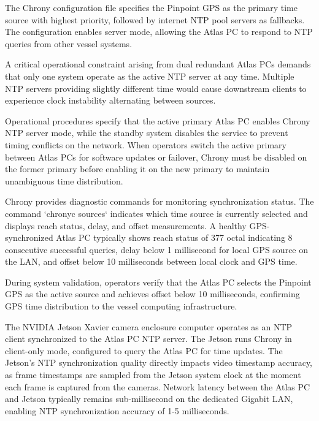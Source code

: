 \documentclass{erauthesis}
\begin{document}
The Chrony configuration file specifies the Pinpoint GPS as the primary time source with highest priority, followed by internet NTP pool servers as fallbacks.
The configuration enables server mode, allowing the Atlas PC to respond to NTP queries from other vessel systems.


A critical operational constraint arising from dual redundant Atlas PCs demands that only one system operate as the active NTP server at any time.
Multiple NTP servers providing slightly different time would cause downstream clients to experience clock instability alternating between sources.

Operational procedures specify that the active primary Atlas PC enables Chrony NTP server mode, while the standby system disables the service to prevent timing conflicts on the network.
When operators switch the active primary between Atlas PCs for software updates or failover, Chrony must be disabled on the former primary before enabling it on the new primary to maintain unambiguous time distribution.


Chrony provides diagnostic commands for monitoring synchronization status.
The command `chronyc sources` indicates which time source is currently selected and displays reach status, delay, and offset measurements.
A healthy GPS-synchronized Atlas PC typically shows reach status of 377 octal indicating 8 consecutive successful queries, delay below 1 millisecond for local GPS source on the LAN, and offset below 10 milliseconds between local clock and GPS time.

During system validation, operators verify that the Atlas PC selects the Pinpoint GPS as the active source and achieves offset below 10 milliseconds, confirming GPS time distribution to the vessel computing infrastructure.


The NVIDIA Jetson Xavier camera enclosure computer operates as an NTP client synchronized to the Atlas PC NTP server.
The Jetson runs Chrony in client-only mode, configured to query the Atlas PC for time updates.
The Jetson's NTP synchronization quality directly impacts video timestamp accuracy, as frame timestamps are sampled from the Jetson system clock at the moment each frame is captured from the cameras.
Network latency between the Atlas PC and Jetson typically remains sub-millisecond on the dedicated Gigabit LAN, enabling NTP synchronization accuracy of 1-5 milliseconds.
\end{document}
